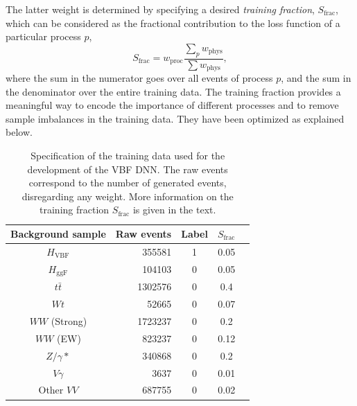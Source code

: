 The latter weight is determined by specifying a desired \emph{training fraction}, $S_\text{frac}$, which can be considered as the fractional contribution to the loss function of a particular process $p$,
\begin{equation}
    S_\text{frac} = w_\text{proc} \frac{\sum_{p} w_\text{phys}}{ \sum w_\text{phys}},
\end{equation}
where the sum in the numerator goes over all events of process $p$, and the sum in the denominator over the entire training data. The training fraction provides a meaningful way to encode the importance of different processes and to remove sample imbalances in the training data. They have been optimized as explained below.

\begin{table}[h]
    \centering
    \small
    \begin{tabular}{ c  | r c c c}
        \toprule
        Background sample  & Raw events & Label & $S_\text{frac}$ \\
        \midrule
        $H_{\mathrm{VBF}}$ & 355581     & 1     & 0.05            \\
        $H_{\mathrm{ggF}}$ & 104103     & 0     & 0.05            \\
        $t\bar{t}$         & 1302576    & 0     & 0.4             \\
        $Wt$               & 52665      & 0     & 0.07            \\
        $WW$ (Strong)      & 1723237    & 0     & 0.2             \\
        $WW$ (EW)          & 823237     & 0     & 0.12            \\
        $Z/\gamma*$        & 340868     & 0     & 0.2             \\
        $V\gamma$          & 3637       & 0     & 0.01            \\
        Other $VV$         & 687755     & 0     & 0.02            \\
        \bottomrule
    \end{tabular}
    \caption{Specification of the training data used for the development of the VBF DNN. The raw events correspond to the number of generated events, disregarding any weight. More information on the training fraction $S_\text{frac}$ is given in the text.}
    \label{tab:DNNtrainingstats}
\end{table}

